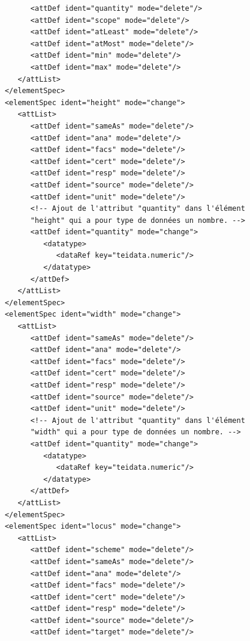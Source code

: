 \documentclass[a4paper,12pt,twoside]{book}
\begin{document}
\begin{verbatim}
                  <attDef ident="quantity" mode="delete"/>
                  <attDef ident="scope" mode="delete"/>
                  <attDef ident="atLeast" mode="delete"/>
                  <attDef ident="atMost" mode="delete"/>
                  <attDef ident="min" mode="delete"/>
                  <attDef ident="max" mode="delete"/>
               </attList>
            </elementSpec>
            <elementSpec ident="height" mode="change">
               <attList>
                  <attDef ident="sameAs" mode="delete"/>
                  <attDef ident="ana" mode="delete"/>
                  <attDef ident="facs" mode="delete"/>
                  <attDef ident="cert" mode="delete"/>
                  <attDef ident="resp" mode="delete"/>
                  <attDef ident="source" mode="delete"/>
                  <attDef ident="unit" mode="delete"/>
                  <!-- Ajout de l'attribut "quantity" dans l'élément 
                  "height" qui a pour type de données un nombre. -->
                  <attDef ident="quantity" mode="change">
                     <datatype>
                        <dataRef key="teidata.numeric"/>
                     </datatype>
                  </attDef>
               </attList>
            </elementSpec>
            <elementSpec ident="width" mode="change">
               <attList>
                  <attDef ident="sameAs" mode="delete"/>
                  <attDef ident="ana" mode="delete"/>
                  <attDef ident="facs" mode="delete"/>
                  <attDef ident="cert" mode="delete"/>
                  <attDef ident="resp" mode="delete"/>
                  <attDef ident="source" mode="delete"/>
                  <attDef ident="unit" mode="delete"/>
                  <!-- Ajout de l'attribut "quantity" dans l'élément 
                  "width" qui a pour type de données un nombre. -->
                  <attDef ident="quantity" mode="change">
                     <datatype>
                        <dataRef key="teidata.numeric"/>
                     </datatype>
                  </attDef>
               </attList>
            </elementSpec>
            <elementSpec ident="locus" mode="change">
               <attList>
                  <attDef ident="scheme" mode="delete"/>
                  <attDef ident="sameAs" mode="delete"/>
                  <attDef ident="ana" mode="delete"/>
                  <attDef ident="facs" mode="delete"/>
                  <attDef ident="cert" mode="delete"/>
                  <attDef ident="resp" mode="delete"/>
                  <attDef ident="source" mode="delete"/>
                  <attDef ident="target" mode="delete"/>

\end{verbatim}
\end{document}
